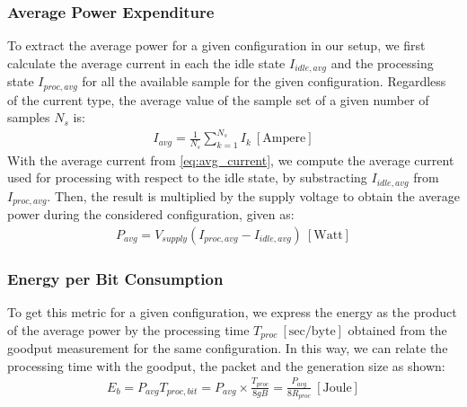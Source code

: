 \subsubsection{Average Power Expenditure}
To extract the average power for a given configuration in our setup, we
first calculate the average current in each the idle state $I_{idle,avg}$
and the processing state $I_{proc,avg}$ for all the available sample for
the given configuration. Regardless of the current type, the average value
of the sample set of a given number of samples $N_s$ is:
%
\begin{align} \label{eq:avg_current}
I_{avg} = \frac{1}{N_s}\sum_{k=1}^{N_s} I_{k}  ~[\mathrm{Ampere}]
\end{align}
%
With the average current from \eqref{eq:avg_current}, we compute the average
current used for processing with respect to the idle state, by substracting
$I_{idle,avg}$ from $I_{proc,avg}$. Then, the result is multiplied by the
supply voltage to obtain the average power during the considered configuration,
given as:
%
\begin{align} \label{eq:avg_power}
P_{avg} = V_{supply}(I_{proc,avg} - I_{idle,avg}) ~[\mathrm{Watt}]
\end{align}
%
\subsubsection{Energy per Bit Consumption}
To get this metric for a given configuration, we express the energy
as the product of the average power by the processing time $T_{proc}
~[\mathrm{sec/byte}]$ obtained from the goodput measurement for the same
configuration. In this way, we can relate the processing time with the
goodput, the packet and the generation size as shown:
%
\begin{align} \label{eq:energy_per_bit}
E_b = P_{avg} T_{proc,bit} = P_{avg} \times \frac{T_{proc}}{8gB} = \frac{P_{avg}}{8R_{proc}} ~[\mathrm{Joule}]
\end{align}
%
